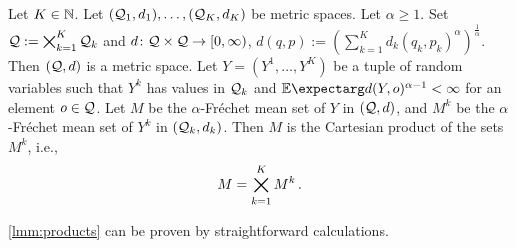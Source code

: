 \begin{lemma}\label{lmm:products}
Let $K\in\mathbb{N}$. Let $(\mathcal{Q}_1, d_1), \dots, (\mathcal{Q}_K, d_K)$ be metric spaces. 
Let $\alpha\geq1$.
Set $\mathcal{Q} := \bigtimes_{k=1}^K \mathcal{Q}_k$ and $d \colon \mathcal{Q} \times \mathcal{Q} \to [0,\infty)$, $d(q,p) := (\sum_{k=1}^K d_k(q_k, p_k)^\alpha)^\frac1\alpha$. Then $(\mathcal{Q}, d)$ is a metric space. Let $Y = (Y^1, \dots, Y^K)$ be a tuple of random variables such that $Y^k$ has values in $\mathcal{Q}_k$ and $\Ex{d(Y,o)^{\alpha-1}} < \infty$ for an element $o\in\mathcal{Q}$. Let $M$ be the $\alpha$-Fréchet mean set of $Y$ in $(\mathcal{Q}, d)$, and $M^k$ be the $\alpha$-Fréchet mean set of $Y^k$ in $(\mathcal{Q}_k, d_k)$. Then $M$ is the Cartesian product of the sets $M^k$, i.e.,
\begin{equation*}
	M = \bigtimes_{k=1}^K M^k
	\, .
\end{equation*}
\end{lemma}
%
\autoref{lmm:products} can be proven by straightforward calculations.
